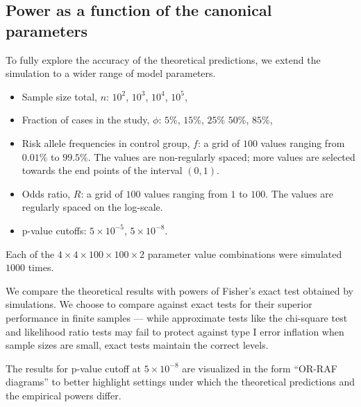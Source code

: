 \subsection{Power as a function of the canonical parameters}

To fully explore the accuracy of the theoretical predictions, we extend the simulation to a wider range of model parameters.
\begin{itemize}
    \item Sample size total, $n$: $10^2$, $10^3$, $10^4$, $10^5$,
    \item Fraction of cases in the study, $\phi$: $5\%$, $15\%$, $25\%$ $50\%$, $85\%$,
    \item Risk allele frequencies in control group, $f$: a grid of $100$ values ranging from $0.01\%$ to $99.5\%$. The values are non-regularly spaced; more values are selected towards the end points of the interval $(0,1)$.
    \item Odds ratio, $R$: a grid of $100$ values ranging from $1$ to $100$. The values are regularly spaced on the log-scale.
    \item p-value cutoffs: $5\times 10^{-5}$, $5\times 10^{-8}$.
\end{itemize}
Each of the $4\times4\times100\times100\times2$ parameter value combinations were simulated $1000$ times.

We compare the theoretical results with powers of Fisher's exact test obtained by simulations.
We choose to compare against exact tests for their superior performance in finite samples ---
while approximate tests like the chi-square test and likelihood ratio tests may fail to protect against type I error inflation when sample sizes are small, exact tests maintain the correct levels. 

The results for p-value cutoff at $5\times 10^{-8}$ are visualized in the form ``OR-RAF diagrams'' to better highlight settings under which the theoretical predictions and the empirical powers differ.

